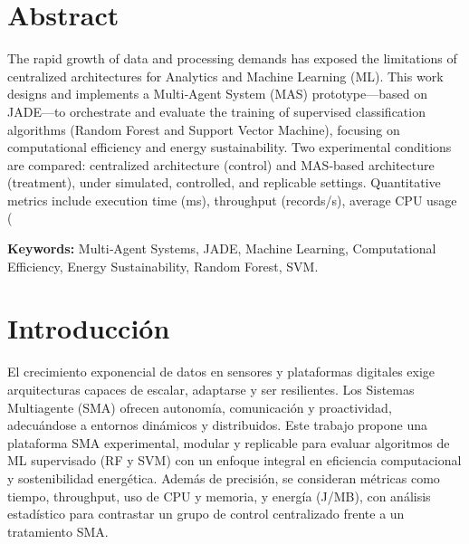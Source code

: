 \documentclass[12pt,oneside]{report}
\begin{document}
\chapter*{Abstract}
The rapid growth of data and processing demands has exposed the limitations of centralized architectures for Analytics and Machine Learning (ML). This work designs and implements a Multi‑Agent System (MAS) prototype—based on JADE—to orchestrate and evaluate the training of supervised classification algorithms (Random Forest and Support Vector Machine), focusing on computational efficiency and energy sustainability. Two experimental conditions are compared: centralized architecture (control) and MAS‑based architecture (treatment), under simulated, controlled, and replicable settings. Quantitative metrics include execution time (ms), throughput (records/s), average CPU usage (%

\vspace{0.5cm}
\noindent\textbf{Keywords:} Multi‑Agent Systems, JADE, Machine Learning, Computational Efficiency, Energy Sustainability, Random Forest, SVM.

\tableofcontents
\listoffigures
\listoftables

\cleardoublepage
{}

\chapter{Introducción}
El crecimiento exponencial de datos en sensores y plataformas digitales exige arquitecturas capaces de escalar, adaptarse y ser resilientes. Los Sistemas Multiagente (SMA) ofrecen autonomía, comunicación y proactividad, adecuándose a entornos dinámicos y distribuidos. Este trabajo propone una plataforma SMA experimental, modular y replicable para evaluar algoritmos de ML supervisado (RF y SVM) con un enfoque integral en eficiencia computacional y sostenibilidad energética. Además de precisión, se consideran métricas como tiempo, throughput, uso de CPU y memoria, y energía (J/MB), con análisis estadístico para contrastar un grupo de control centralizado frente a un tratamiento SMA.
\end{document}
